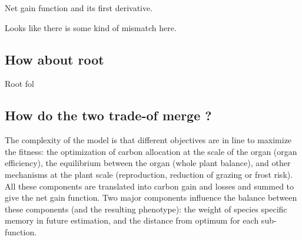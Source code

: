 \documentclass[a4paper, justified,marginals=raggedright]{tufte-handout}
\begin{document}
\begin{marginfigure}
\label{fig:derivaives}
\caption{Net gain function and its first derivative.} Looks like there is some kind of mismatch here.
\end{marginfigure}

\subsection{How about root}
Root fol

\subsection{How do the two trade-of merge ?}
The complexity of the model is that different objectives are in line to maximize the fitness: the optimization of carbon allocation at the scale of the organ (organ efficiency), the equilibrium between the organ (whole plant balance), and other mechanisms at the plant scale (reproduction, reduction of grazing or frost risk). All these components are translated into carbon gain and losses and summed to give the net gain function. Two major components influence the balance between these components (and the resulting phenotype): the weight of species specific memory in future estimation, and the distance from optimum for each sub-function. 
\end{document}
